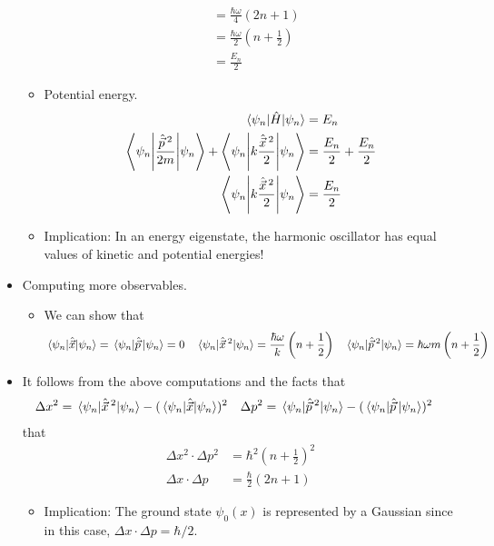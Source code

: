 \documentclass[../notes.tex]{subfiles}
\begin{document}
\begin{itemize}
\begin{itemize}
\begin{align*}
            &= \frac{\hbar\omega}{4}(2n+1)\\
            &= \frac{\hbar\omega}{2}\left( n+\frac{1}{2} \right)\\
            &= \frac{E_n}{2}
        \end{align*}
        \item Potential energy.
        \begin{align*}
            \ev{\hat{H}}{\psi_n} &= E_n\\
            \ev**{\frac{\hat{\vec{p}}{\,}^2}{2m}}{\psi_n}+\ev**{k\frac{\hat{\vec{x}}{\,}^2}{2}}{\psi_n} &= \frac{E_n}{2}+\frac{E_n}{2}\\
            \ev**{k\frac{\hat{\vec{x}}{\,}^2}{2}}{\psi_n} &= \frac{E_n}{2}
        \end{align*}
        \item Implication: In an energy eigenstate, the harmonic oscillator has equal values of kinetic and potential energies!
    \end{itemize}
    \pagebreak
    \item Computing more observables.
    \begin{itemize}
        \item We can show that
        \begin{align*}
            \ev{\hat{\vec{x}}}{\psi_n} &= \ev{\hat{\vec{p}}\,}{\psi_n} = 0&
            \ev{\hat{\vec{x}}{\,}^2}{\psi_n} &= \frac{\hbar\omega}{k}\left( n+\frac{1}{2} \right)&
            \ev{\hat{\vec{p}}{\,}^2}{\psi_n} &= \hbar\omega m\left( n+\frac{1}{2} \right)
        \end{align*}
    \end{itemize}
    \item It follows from the above computations and the facts that
    \begin{align*}
        \Delta x^2 &= \ev{\hat{\vec{x}}{\,}^2}{\psi_n}-(\ev{\hat{\vec{x}}}{\psi_n})^2&
        \Delta p^2 &= \ev{\hat{\vec{p}}{\,}^2}{\psi_n}-(\ev{\hat{\vec{p}}\,}{\psi_n})^2
    \end{align*}
    that
    \begin{align*}
        \Delta x^2\cdot\Delta p^2 &= \hbar^2\left( n+\frac{1}{2} \right)^2\\
        \Delta x\cdot\Delta p &= \frac{\hbar}{2}(2n+1)
    \end{align*}
    \begin{itemize}
        \item Implication: The ground state $\psi_0(x)$ is represented by a Gaussian since in this case, $\Delta x\cdot\Delta p=\hbar/2$.

\end{itemize}
\end{itemize}
\end{document}
